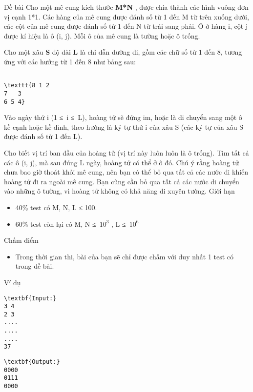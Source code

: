 Đề bài
Cho một mê cung kích thước \textbf{ M*N } , được chia thành các hình vuông đơn vị cạnh 1*1. Các hàng của mê cung được đánh số từ 1 đến M từ trên xuống dưới, các cột của mê cung được đánh số từ 1 đến N từ trái sang phải. Ô ở hàng i, cột j được kí hiệu là ô (i, j). Mỗi ô của mê cung là tường hoặc ô trống.

Cho một xâu \textbf{ S } độ dài \textbf{ L } là chỉ dẫn đường đi, gồm các chữ số từ 1 đến 8, tương ứng với các hướng từ 1 đến 8 như bảng sau:
\begin{verbatim}

\texttt{8 1 2
7   3
6 5 4}\end{verbatim}

Vào ngày thứ i (1 ≤ i ≤ L), hoàng tử sẽ đứng im, hoặc là di chuyển sang một ô kề cạnh hoặc kề đỉnh, theo hướng là ký tự thứ i của xâu S (các ký tự của xâu S được đánh số từ 1 đến L).

Cho biết vị trí ban đầu của hoàng tử (vị trí này luôn luôn là ô trống). Tìm tất cả các ô (i, j), mà sau đúng L ngày, hoàng tử có thể ở ô đó. Chú ý rằng hoàng tử chưa bao giờ thoát khỏi mê cung, nên bạn có thể bỏ qua tất cả các nước đi khiến hoàng tử đi ra ngoài mê cung. Bạn cũng cần bỏ qua tất cả các nước di chuyển vào những ô tường, vì hoàng tử không có khả năng đi xuyên tường.
Giới hạn
\begin{itemize}
	\item 40\% test có M, N, L ≤ 100.
	\item 60\% test còn lại có M, N ≤ $10^{3}$ , L ≤ $10^{6}$
\end{itemize}
Chấm điểm
\begin{itemize}
	\item Trong thời gian thi, bài của bạn sẽ chỉ được chấm với duy nhất 1 test có trong đề bài.
\end{itemize}
Ví dụ
\begin{verbatim}
\textbf{Input:}
3 4
2 3
....
....
....
37\end{verbatim}
\begin{verbatim}
\textbf{Output:}
0000
0111
0000
\end{verbatim}